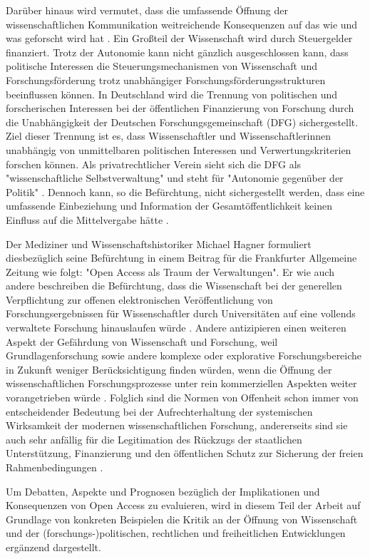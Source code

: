 Darüber hinaus wird vermutet, dass die umfassende Öffnung der wissenschaftlichen Kommunikation weitreichende Konsequenzen auf das wie und was geforscht wird hat \cite{Szczesny_2014} \cite{Weingart_2005}. Ein Großteil der Wissenschaft wird durch Steuergelder finanziert. Trotz der Autonomie kann nicht gänzlich ausgeschlossen kann, dass politische Interessen die Steuerungsmechanismen von Wissenschaft und Forschungsförderung trotz unabhängiger Forschungsförderungsstrukturen beeinflussen können. In Deutschland wird die Trennung von politischen und forscherischen Interessen bei der öffentlichen Finanzierung von Forschung durch die Unabhängigkeit der Deutschen Forschungsgemeinschaft (DFG) sichergestellt. Ziel dieser Trennung ist es, dass Wissenschaftler und Wissenschaftlerinnen unabhängig von unmittelbaren politischen Interessen und Verwertungskriterien forschen können. Als privatrechtlicher Verein sieht sich die DFG als "wissenschaftliche Selbstverwaltung" und steht für "Autonomie gegenüber der Politik" \cite{DFG_2011}. Dennoch kann, so die Befürchtung, nicht sichergestellt werden, dass eine umfassende Einbeziehung und Information der Gesamtöffentlichkeit keinen Einfluss auf die Mittelvergabe hätte \cite{Weingart_2005}.

Der Mediziner und Wissenschaftshistoriker Michael Hagner formuliert diesbezüglich seine Befürchtung in einem Beitrag für die Frankfurter Allgemeine Zeitung wie folgt: "Open Access als Traum der Verwaltungen". Er wie auch andere beschreiben die Befürchtung, dass die Wissenschaft bei der generellen Verpflichtung zur offenen elektronischen Veröffentlichung von Forschungsergebnissen für Wissenschaftler durch Universitäten auf eine vollends verwaltete Forschung hinauslaufen würde \cite{Hagner_2009}. Andere antizipieren einen weiteren Aspekt der Gefährdung von Wissenschaft und Forschung, weil Grundlagenforschung sowie andere komplexe oder explorative Forschungsbereiche in Zukunft weniger Berücksichtigung finden würden, wenn die Öffnung der wissenschaftlichen Forschungsprozesse unter rein kommerziellen Aspekten weiter vorangetrieben würde \cite{Szczesny_2014}. Folglich sind die Normen von Offenheit schon immer von entscheidender Bedeutung bei der Aufrechterhaltung der systemischen Wirksamkeit der modernen wissenschaftlichen Forschung, andererseits sind sie auch sehr anfällig für die Legitimation des Rückzugs der staatlichen Unterstützung, Finanzierung und den öffentlichen Schutz zur Sicherung der freien Rahmenbedingungen \cite{David_1998}.

Um Debatten, Aspekte und Prognosen bezüglich der Implikationen und Konsequenzen von Open Access zu evaluieren, wird in diesem Teil der Arbeit auf Grundlage von konkreten Beispielen die Kritik an der Öffnung von Wissenschaft und der (forschungs-)politischen, rechtlichen und freiheitlichen Entwicklungen ergänzend dargestellt.

